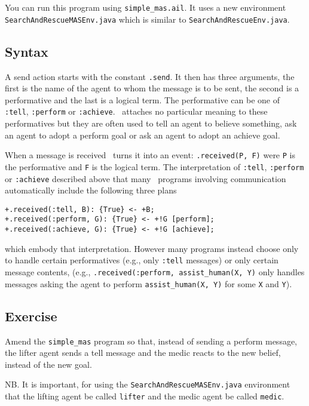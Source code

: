 \documentclass[a4]{article}
\begin{document}
You can run this program using \texttt{simple\_mas.ail}.  It uses a new environment \texttt{SearchAndRescueMASEnv.java} which is similar to \texttt{SearchAndRescueEnv.java}.

\subsection{Syntax}

A send action starts with the constant \texttt{.send}.  It then has three arguments, the first is the name of the agent to whom the message is to be sent, the second is a performative and the last is a logical term.  The performative can be one of \texttt{:tell}, \texttt{:perform} or \texttt{:achieve}.  \gwendolen\ attaches no particular meaning to these performatives but they are often used to tell an agent to believe something, ask an agent to adopt a perform goal or ask an agent to adopt an achieve goal.

When a message is received \gwendolen\ turns it into an event: \texttt{.received(P, F)} were \texttt{P} is the performative and \texttt{F} is the logical term.  The interpretation of \texttt{:tell}, \texttt{:perform} or \texttt{:achieve} described above that many \gwendolen\ programs involving communication automatically include the following three plans 
\begin{verbatim}
+.received(:tell, B): {True} <- +B;
+.received(:perform, G): {True} <- +!G [perform];
+.received(:achieve, G): {True} <- +!G [achieve];
\end{verbatim}
which embody that interpretation.  However many programs instead choose only to handle certain performatives (e.g., only \texttt{:tell} messages) or only certain message contents, (e.g., \texttt{.received(:perform, assist\_human(X, Y)} only handles messages asking the agent to perform \texttt{assist\_human(X, Y)} for some \texttt{X} and \texttt{Y}).

\subsection{Exercise}
Amend the \texttt{simple\_mas} program so that, instead of sending a perform message, the lifter agent sends a tell message and the medic reacts to the new belief, instead of the new goal.

NB. It is important, for using the \texttt{SearchAndRescueMASEnv.java} environment that the lifting agent be called \texttt{lifter} and the medic agent be called \texttt{medic}.
\end{document}
